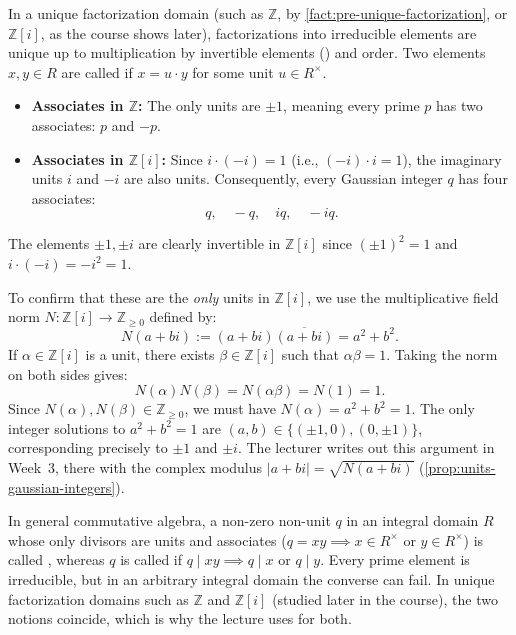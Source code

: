 \begin{content}
\begin{steps}
In a unique factorization domain (such as $\mathbb{Z}$, by \cref{fact:pre-unique-factorization}, or $\mathbb{Z}[i]$, as the course shows later), factorizations into irreducible elements are unique up to multiplication by invertible elements () and order. Two elements $x, y \in R$ are called  if $x = u \cdot y$ for some unit $u \in R^\times$.
\begin{itemize}
    \item \textbf{Associates in $\mathbb{Z}$:} The only units are $\pm 1$, meaning every prime $p$ has two associates: $p$ and $-p$.
    \item \textbf{Associates in {$\mathbb{Z}[i]$}:} Since $i \cdot (-i) = 1$ (i.e., $(-i) \cdot i = 1$), the imaginary units $i$ and $-i$ are also units. Consequently, every Gaussian integer $q$ has four associates:
    \[
    q, \quad -q, \quad iq, \quad -iq.
    \]
\end{itemize}
\end{steps}

\begin{steps}
The elements $\pm 1, \pm i$ are clearly invertible in $\mathbb{Z}[i]$ since $(\pm 1)^2 = 1$ and $i \cdot (-i) = -i^2 = 1$.

To confirm that these are the \emph{only} units in $\mathbb{Z}[i]$, we use the multiplicative field norm $N \colon \mathbb{Z}[i] \to \mathbb{Z}_{\ge 0}$ defined by:
\[
N(a + bi) := (a + bi)\overline{(a + bi)} = a^2 + b^2.
\]
If $\alpha \in \mathbb{Z}[i]$ is a unit, there exists $\beta \in \mathbb{Z}[i]$ such that $\alpha \beta = 1$. Taking the norm on both sides gives:
\[
N(\alpha) N(\beta) = N(\alpha \beta) = N(1) = 1.
\]
Since $N(\alpha), N(\beta) \in \mathbb{Z}_{\ge 0}$, we must have $N(\alpha) = a^2 + b^2 = 1$. The only integer solutions to $a^2 + b^2 = 1$ are $(a, b) \in \{(\pm 1, 0), (0, \pm 1)\}$, corresponding precisely to $\pm 1$ and $\pm i$. The lecturer writes out this argument in Week~3, there with the complex modulus $|a + bi| = \sqrt{N(a + bi)}$ (\cref{prop:units-gaussian-integers}).
\end{steps}
\end{content}

\begin{aiNote}
In general commutative algebra, a non-zero non-unit $q$ in an integral domain $R$ whose only divisors are units and associates ($q = xy \implies x \in R^\times$ or $y \in R^\times$) is called , whereas $q$ is called  if $q \mid xy \implies q \mid x$ or $q \mid y$. Every prime element is irreducible, but in an arbitrary integral domain the converse can fail. In unique factorization domains such as $\mathbb{Z}$ and $\mathbb{Z}[i]$ (studied later in the course), the two notions coincide, which is why the lecture uses  for both.
\end{aiNote}

